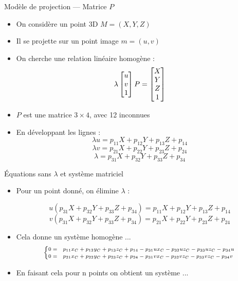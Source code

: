 \begin{frame}{Modèle de projection — Matrice \( P \)}

\begin{itemize}
  \item<1-> On considère un point 3D \( M = (X, Y, Z) \)
  \item<2-> Il se projette sur un point image \( m = (u, v) \)

  \item<3-> On cherche une relation linéaire homogène :
  \[
  \lambda
  \begin{bmatrix}
  u \cr v \cr 1
  \end{bmatrix}
  P
  =
  \begin{bmatrix}
  X \cr Y \cr Z \cr 1
  \end{bmatrix}
  \]

  \item<4-> \( P \) est une matrice \( 3 \times 4 \), avec 12 inconnues
  \item<5-> En développant les lignes :
  \[
  \lambda u = p_{11}X + p_{12}Y + p_{13}Z + p_{14}
  \]
  \[
  \lambda v = p_{21}X + p_{22}Y + p_{23}Z + p_{24}
  \]
  \[
  \lambda   = p_{31}X + p_{32}Y + p_{33}Z + p_{34}
  \]
\end{itemize}
\end{frame}


\begin{frame}{Équations sans \(\lambda\) et système matriciel}

\begin{itemize}
  \item<1-> Pour un point donné, on élimine \( \lambda \) :
  
  \[
  u (p_{31}X + p_{32}Y + p_{33}Z + p_{34}) = p_{11}X + p_{12}Y + p_{13}Z + p_{14}
  \]
  \[
  v (p_{31}X + p_{32}Y + p_{33}Z + p_{34}) = p_{21}X + p_{22}Y + p_{23}Z + p_{24}
  \]

  \vspace{0.5em}
   \item<2-> Cela donne un système homogène ...
   \[
   \scriptsize
   \begin{cases}
0= & p_{11} x_{C} +p_{12} y_{C}  +p_{13} z_{C} +p_{14} -p_{31} u x_{C} -p_{32} u  z_{C}  -p_{33} u  z_{C}  -p_{34} u \\
0= &  p_{21} x_{C}  +p_{22} y_{C}  +p_{23} z_{C}  +p_{24} -p_{31} v  x_{C}  -p_{32} v  z_{C}  -p_{33} v  z_{C}  -p_{34} v 
\end{cases}
   \]
  \item<3-> En faisant cela pour n points on obtient un système ...
\end{itemize}

\end{frame}


